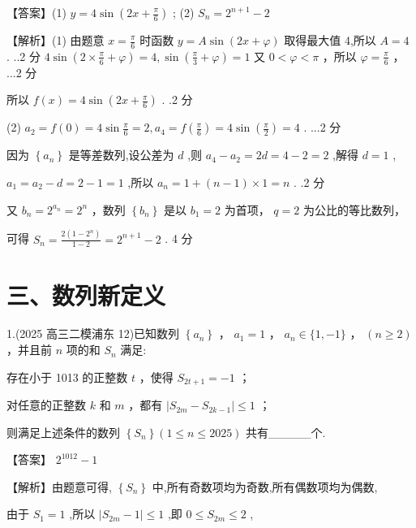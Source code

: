 \documentclass[10pt]{article}
\newcommand*\circled[1]{\tikz[baseline=(char.base)]{\node[shape=circle,draw,inner sep=1.5pt] (char) {\small #1};}}
\begin{document}
【答案】(1) \(y = 4\sin \left( {{2x} + \frac{\pi }{6}}\right)\) ; (2) \({S}_{n} = {2}^{n + 1} - 2\)

【解析】(1) 由题意 \(x = \frac{\pi }{6}\) 时函数 \(y = A\sin \left( {{2x} + \varphi }\right)\) 取得最大值 4,所以 \(A = 4\) . ..2 分 \(4\sin \left( {2 \times  \frac{\pi }{6} + \varphi }\right)  = 4,\sin \left( {\frac{\pi }{3} + \varphi }\right)  = 1\) 又 \(0 < \varphi  < \pi\) ，所以 \(\varphi  = \frac{\pi }{6}\) ， ...2 分

所以 \(f\left( x\right)  = 4\sin \left( {{2x} + \frac{\pi }{6}}\right)\) . .2 分

(2) \({a}_{2} = f\left( 0\right)  = 4\sin \frac{\pi }{6} = 2,{a}_{4} = f\left( \frac{\pi }{6}\right)  = 4\sin \left( \frac{\pi }{2}\right)  = 4\) . ...2 分

因为 \(\left\{  {a}_{n}\right\}\) 是等差数列,设公差为 \(d\) ,则 \({a}_{4} - {a}_{2} = {2d} = 4 - 2 = 2\) ,解得 \(d = 1\) ,

\({a}_{1} = {a}_{2} - d = 2 - 1 = 1\) ,所以 \({a}_{n} = 1 + \left( {n - 1}\right)  \times  1 = n\) . .2 分

又 \({b}_{n} = {2}^{{a}_{n}} = {2}^{n}\) ，数列 \(\left\{  {b}_{n}\right\}\) 是以 \({b}_{1} = 2\) 为首项， \(q = 2\) 为公比的等比数列，

可得 \({S}_{n} = \frac{2\left( {1 - {2}^{n}}\right) }{1 - 2} = {2}^{n + 1} - 2\) . 4 分

\section*{三、数列新定义}

1.(2025 高三二模浦东 12)已知数列 \(\left\{  {a}_{n}\right\}\) ， \({a}_{1} = 1\) ， \({a}_{n} \in  \{ 1, - 1\}\) ， \(\left( {n \geq  2}\right)\) ，并且前 \(n\) 项的和 \({S}_{n}\) 满足:

 \circled{1} 存在小于 1013 的正整数 \(t\) ，使得 \({S}_{{2t} + 1} =  - 1\) ；

 \circled{2} 对任意的正整数 \(k\) 和 \(m\) ，都有 \(\left| {{S}_{2m} - {S}_{{2k} - 1}}\right|  \leq  1\) ；

则满足上述条件的数列 \(\left\{  {S}_{n}\right\}  \left( {1 \leq  n \leq  {2025}}\right)\) 共有\_\_\_\_\_个.

【答案】 \({2}^{1012} - 1\)

【解析】由题意可得, \(\left\{  {S}_{n}\right\}\) 中,所有奇数项均为奇数,所有偶数项均为偶数,

由于 \({S}_{1} = 1\) ,所以 \(\left| {{S}_{2m} - 1}\right|  \leq  1\) ,即 \(0 \leq  {S}_{2m} \leq  2\) ,
\end{document}
